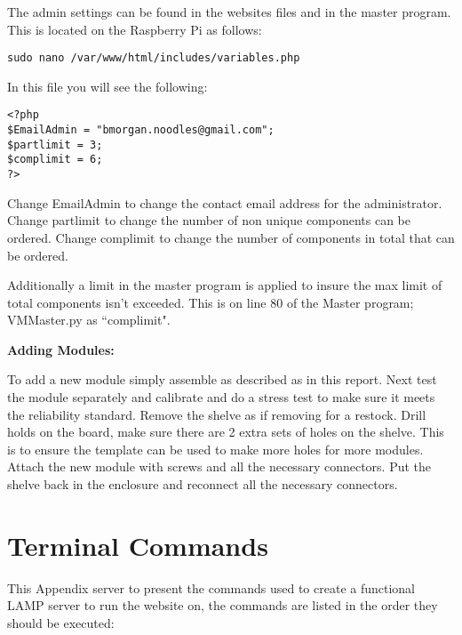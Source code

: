 \documentclass[a4paper,11pt]{article}
\numberwithin{figure}{section}
\numberwithin{table}{section}
\begin{document}
\begin{appendices}
The admin settings can be found in the websites files and in the master program. This is located on the Raspberry Pi as follows:
\begin{lstlisting}
sudo nano /var/www/html/includes/variables.php
\end{lstlisting}
In this file you will see the following:
\begin{lstlisting}
<?php
$EmailAdmin = "bmorgan.noodles@gmail.com";
$partlimit = 3;
$complimit = 6;
?>
\end{lstlisting}
Change EmailAdmin to change the contact email address for the administrator. Change partlimit to change the number of non unique components can be ordered. Change complimit to change the number of components in total that can be ordered.

Additionally a limit in the master program is applied to insure the max limit of total components isn't exceeded. This is on line 80 of the Master program; VMMaster.py as ``complimit".

\textbf{Adding Modules:}

To add a new module simply assemble as described as in this report. Next test the module separately and calibrate and do a stress test to make sure it meets the reliability standard. Remove the shelve as if removing for a restock. Drill holds on the board, make sure there are 2 extra sets of holes on the shelve. This is to ensure the template can be used to make more holes for more modules. Attach the new module with screws and all the necessary connectors. Put the shelve back in the enclosure and reconnect all the necessary connectors.
\newpage

\section{Terminal Commands}\thispagestyle{sectionstart}
\label{sec:PiCommands}

This Appendix server to present the commands used to create a functional LAMP server to run the website on, the commands are listed in the order they should be executed:


\end{appendices}
\end{document}
